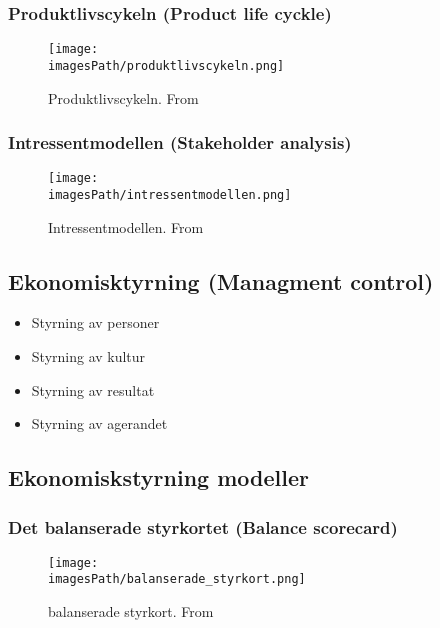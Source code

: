 \newpage
\subsubsection{Produktlivscykeln (Product life cyckle)}
\begin{figure}[!ht]
    \centering
    \texttt{[image: \\imagesPath/produktlivscykeln.png]}
    \caption{Produktlivscykeln. From \cite{}}
\end{figure}

\subsubsection{Intressentmodellen (Stakeholder analysis)}
\begin{figure}[!ht]
    \centering
    \texttt{[image: \\imagesPath/intressentmodellen.png]}
    \caption{Intressentmodellen. From \cite{}}
\end{figure}


\subsection{Ekonomisktyrning (Managment control)}
\begin{itemize}
    \item Styrning av personer
    \item Styrning av kultur
    \item Styrning av resultat
    \item Styrning av agerandet
\end{itemize}

\subsection{Ekonomiskstyrning modeller}
\subsubsection{Det balanserade styrkortet (Balance scorecard)}
\begin{figure}[!ht]
    \centering
    \texttt{[image: \\imagesPath/balanserade\_styrkort.png]}
    \caption{balanserade styrkort. From \cite{}}
\end{figure}

